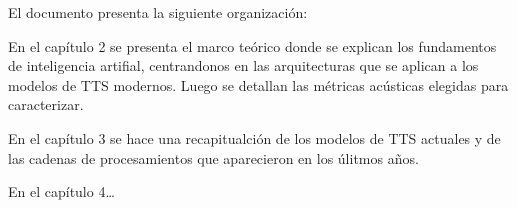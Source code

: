 El documento presenta la siguiente organización:

En el capítulo 2 se presenta el marco teórico donde se explican los fundamentos de inteligencia artifial, centrandonos en las arquitecturas que se aplican a los modelos de TTS modernos. Luego se detallan las métricas acústicas elegidas para caracterizar.

En el capítulo 3 se hace una recapitualción de los modelos de TTS actuales y de las cadenas de procesamientos que aparecieron en los úlitmos años.

En el capítulo 4…
